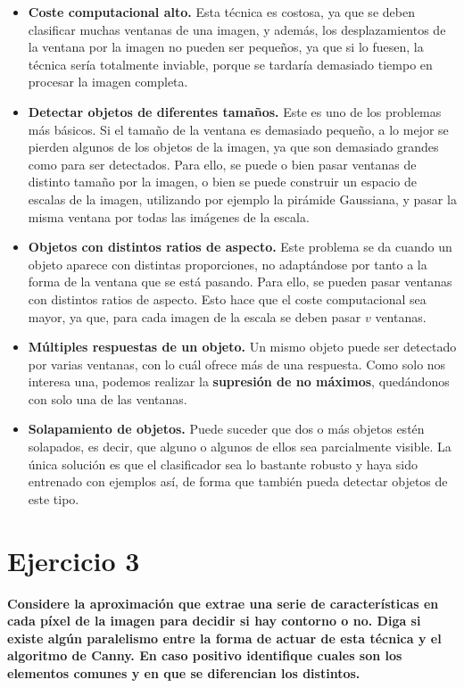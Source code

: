 \documentclass[11pt,a4paper]{article}
\newcommand{\question}[1]{\noindent\textbf{#1}}
\newcommand{\nonumsection}[1]{\section*{#1}\addcontentsline{toc}{section}{#1}}
\begin{document}
\begin{itemize}[label=\textbullet]
  \item \textbf{Coste computacional alto.} Esta técnica es costosa, ya que
  se deben clasificar muchas ventanas de una imagen, y además, los desplazamientos
  de la ventana por la imagen no pueden ser pequeños, ya que si lo fuesen, la técnica
  sería totalmente inviable, porque se tardaría demasiado tiempo en procesar la imagen
  completa.
  \item \textbf{Detectar objetos de diferentes tamaños.} Este es uno de los
  problemas más básicos. Si el tamaño de la ventana es demasiado pequeño, a
  lo mejor se pierden algunos de los objetos de la imagen, ya que son demasiado
  grandes como para ser detectados. Para ello, se puede o bien pasar
  ventanas de distinto tamaño por la imagen, o bien se puede construir un
  espacio de escalas de la imagen, utilizando por ejemplo la pirámide Gaussiana,
  y pasar la misma ventana por todas las imágenes de la escala.
  \item \textbf{Objetos con distintos ratios de aspecto.} Este problema se da cuando
  un objeto aparece con distintas proporciones, no adaptándose por tanto
  a la forma de la ventana que se está pasando. Para ello, se pueden pasar
  ventanas con distintos ratios de aspecto. Esto hace que el coste computacional
  sea mayor, ya que, para cada imagen de la escala se deben pasar $v$ ventanas.
  \item \textbf{Múltiples respuestas de un objeto.} Un mismo objeto puede ser
  detectado por varias ventanas, con lo cuál ofrece más de una respuesta. Como
  solo nos interesa una, podemos realizar la \textbf{supresión de no máximos},
  quedándonos con solo una de las ventanas.
  \item \textbf{Solapamiento de objetos.} Puede suceder que dos o más objetos
  estén solapados, es decir, que alguno o algunos de ellos sea parcialmente
  visible. La única solución es que el clasificador sea lo bastante robusto
  y haya sido entrenado con ejemplos así, de forma que también pueda detectar
  objetos de este tipo.  
\end{itemize}

\nonumsection{Ejercicio 3}

\question{Considere la aproximación que extrae una serie de
características en cada píxel de la imagen para decidir si hay
contorno o no. Diga si existe algún paralelismo entre la forma de
actuar de esta técnica y el algoritmo de Canny. En caso positivo
identifique cuales son los elementos comunes y en que se diferencian
los distintos.}
\end{document}
